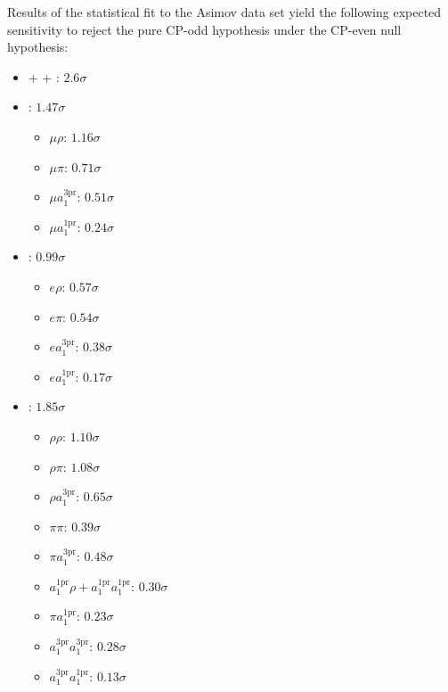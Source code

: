 Results of the statistical fit to the Asimov data set yield the following expected sensitivity to reject the pure CP-odd hypothesis under the CP-even null hypothesis:
\begin{itemize}
    \item \mt + \et + \tata: $2.6\sigma$ 
    
    \item \mt: $1.47\sigma$ 
    \begin{itemize}
        \item $\mu\rho$: $1.16\sigma$ 
        \item $\mu\pi$: $0.71\sigma$ 
        \item $\mu a_1^\text{3pr}$: $0.51\sigma$ 
        \item $\mu a_1^\text{1pr}$: $0.24\sigma$ 
    \end{itemize}
    
    \item \et: $0.99\sigma$ 
    \begin{itemize}
        \item $e\rho$: $0.57\sigma$ 
        \item $e\pi$: $0.54\sigma$ 
        \item $e a_1^\text{3pr}$: $0.38\sigma$ 
        \item $e a_1^\text{1pr}$: $0.17\sigma$ 
    \end{itemize}
    
    \item \tata:  $1.85\sigma$ 
    \begin{itemize}
        \item $\rho\rho$: $1.10\sigma$ 
        \item $\rho\pi$: $1.08\sigma$ 
        \item $\rho a_1^\text{3pr}$: $0.65\sigma$ 
        \item $\pi\pi$: $0.39\sigma$ 
        \item $\pi a_1^\text{3pr}$: $0.48\sigma$       
        \item $a_1^\text{1pr}\rho + a_1^\text{1pr}a_1^\text{1pr}$: $0.30\sigma$ 
        \item $\pi a_1^\text{1pr}$: $0.23\sigma$    
        \item $a_1^\text{3pr}a_1^\text{3pr}$: $0.28\sigma$ 
        \item $a_1^\text{3pr}a_1^\text{1pr}$: $0.13\sigma$ 
    \end{itemize}
\end{itemize}

